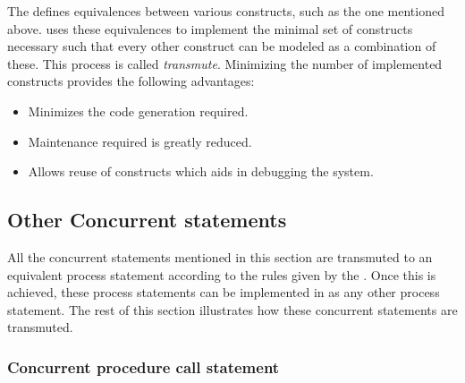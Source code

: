 \documentclass[11pt]{article}
\begin{document}
The \LRM\/ defines equivalences between various constructs, such as
the one mentioned above.  \tyvis\/ uses these equivalences to
implement the minimal set of constructs necessary such that every
other construct can be modeled as a combination of these.  This
process is called \textit{transmute}.  Minimizing the number of
implemented constructs provides the following advantages:

\begin{itemize}
\item Minimizes the code generation required.
\item Maintenance required is greatly reduced.
\item Allows reuse of constructs which aids in debugging the system.
\end{itemize}



\subsection{Other Concurrent statements}

All the concurrent statements mentioned in this section are transmuted
to an equivalent process statement according to the rules given by the
\LRM.  Once this is achieved, these process statements can be
implemented in \tyvis\/ as any other process statement.  The rest of
this section illustrates how these concurrent statements are
transmuted.

\subsubsection{Concurrent procedure call statement}

\end{document}
